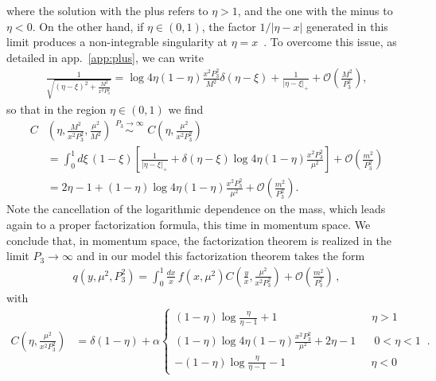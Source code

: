 where the solution with the plus refers to $\eta>1$, and the one with the minus
to $\eta<0$. On the other hand, if $\eta \in \left(0,1\right)$, the factor
$1/|\eta-x|$ generated in this limit produces a non-integrable singularity at
$\eta = x$~\cite{Radyushkin:2017lvu}. To overcome this issue, as detailed in app.~\ref{app:plus}, we can
write
\begin{align}
	\label{eq::limit} 
	\frac{1}{\sqrt{\left(\eta-\xi\right)^2 + \frac{M^2}{x^2 P_3^2}}} 
	= \log 4\eta\left(1-\eta\right) \frac{x^2P_3^2}{M^2}
	\delta\left(\eta-\xi\right) + \frac{1}{|\eta-\xi|_+} + \mathcal{O}\left(\frac{M^2}{P_3^2}\right),
\end{align}
so that in the region $\eta \in \left(0,1\right)$  we find
\begin{align}
	C&\left(\eta,\frac{M^2}{x^2 P_3^2}, \frac{\mu^2}{M^2}\right) 
	 \,\,
	\stackrel{P_3\rightarrow \infty}{\sim}\,\, C\left(\eta,\frac{\mu^2}{x^2 P_3^2}\right) \nonumber\\
	&=\int_0^1 d\xi\, \left(1-\xi\right) 
	\left[\frac{1}{|\eta-\xi|_+} + \delta\left(\eta-\xi\right)
	\log 4\eta\left(1-\eta\right)
	\frac{x^2P_3^2}{\mu^2} \right]  + \mathcal{O}\left(\frac{m^2}{P_3^2}\right) \nonumber \\
	&=2\eta -1 + \left(1-\eta\right)
	\log 4\eta\left(1-\eta\right) \frac{x^2P_3^2}{\mu^2} + \mathcal{O}\left(\frac{m^2}{P_3^2}\right). 
\end{align}
Note the cancellation of the logarithmic dependence on the mass, which leads
again to a proper factorization formula, this time in momentum space. We
conclude that, in momentum space, the factorization theorem is realized in the
limit $P_3\rightarrow \infty$ and in our model this factorization theorem takes
the form
\begin{align}
	\label{eq::factmomentum}
	q\left(y, \mu^2, P_3^2\right) = 
	\int_{0}^{1} \frac{dx}{x}\, 
	f\left(x,\mu^2\right) 
	C\left(\frac{y}{x},\frac{\mu^2}{x^2 P_3^2}\right) + \mathcal{O}\left(\frac{m^2}{P_3^2}\right)\, ,
\end{align}
with
\begin{equation}
	\label{eq::matching_scalar}
	\begin{split}
	C\left(\eta,\frac{\mu^2}{x^2 P_3^2} \right)&= \delta\left(1-\eta\right) + \alpha 
	\begin{cases} 
	\left(1-\eta\right)\log\frac{\eta}{\eta-1} + 1 
	\,\,\,\,\,\,\,\,\,\,\,\,\,\,\,\,\,\,\,\,\,\,\,\,\,\,\,\,\,\,\,\,\,\,\,\,\,\,\,\,\,\,\,\,\,\,\,\,\,\,\, \eta > 1\\ 
	\left(1-\eta\right)\log 4\eta\left(1-\eta\right)\frac{x^2P_3^2}{\mu^2} + 2\eta -1 \,\,\,\,\,\,\,\,\,\, 0<\eta < 1 \\ 
	-\left(1-\eta\right)\log\frac{\eta}{\eta-1} - 1 \,\,\,\,\,\,\,\,\,\,\,\,\,\,\,\,\,\,\,\,\,\,\,\,\,\,\,\,\,\,\,\,\,\,\,\,\,\,\,\,\,\,\,\,\,\, \eta<0
	\end{cases}
	\,.
	\end{split}
\end{equation}

